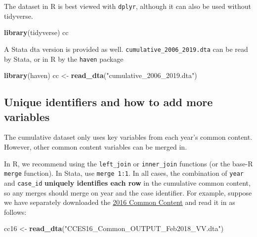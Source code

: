 \documentclass[10pt,article,oneside]{memoir}
\theoremstyle{definition}
\newenvironment{Shaded}{\begin{snugshade}}{\end{snugshade}}
\newcommand{\KeywordTok}[1]{\textcolor[rgb]{0.13,0.29,0.53}{\textbf{#1}}}
\newcommand{\NormalTok}[1]{#1}
\newcommand{\StringTok}[1]{\textcolor[rgb]{0.31,0.60,0.02}{#1}}
\begin{document}
\noindent The dataset in R is best viewed with \texttt{dplyr}, although
it can also be used without tidyverse.

\begin{Shaded}
\begin{Highlighting}[]
\KeywordTok{library}\NormalTok{(tidyverse)}
\NormalTok{cc}
\end{Highlighting}
\end{Shaded}

\noindent  A Stata dta version is provided as well.
\texttt{cumulative\_2006\_2019.dta} can be read by Stata, or in R by the
\texttt{haven} package

\begin{Shaded}
\begin{Highlighting}[]
\KeywordTok{library}\NormalTok{(haven)}
\NormalTok{cc \textless{}{-}}\StringTok{ }\KeywordTok{read\_dta}\NormalTok{(}\StringTok{"cumulative\_2006\_2019.dta"}\NormalTok{)}
\end{Highlighting}
\end{Shaded}

\hypertarget{unique-identifiers-and-how-to-add-more-variables}{%
\subsection{Unique identifiers and how to add more
variables}\label{unique-identifiers-and-how-to-add-more-variables}}

The cumulative dataset only uses key variables from each year's common
content. However, other common content variables can be merged in.

In R, we recommend using the \texttt{left\_join} or \texttt{inner\_join}
functions (or the base-R \texttt{merge} function). In Stata, use
\texttt{merge\ 1:1}. In all cases, the combination of \texttt{year} and
\texttt{case\_id} \textbf{uniquely identifies each row} in the
cumulative common content, so any merges should merge on year and the
case identifier. For example, suppose we have separately downloaded the
\href{https://doi.org/10.7910/DVN/GDF6Z0/JPMOZZ}{2016 Common Content}
and read it in as follows:

\begin{Shaded}
\begin{Highlighting}[]
\NormalTok{cc16 \textless{}{-}}\StringTok{ }\KeywordTok{read\_dta}\NormalTok{(}\StringTok{"CCES16\_Common\_OUTPUT\_Feb2018\_VV.dta"}\NormalTok{)}
\end{Highlighting}
\end{Shaded}
\end{document}
